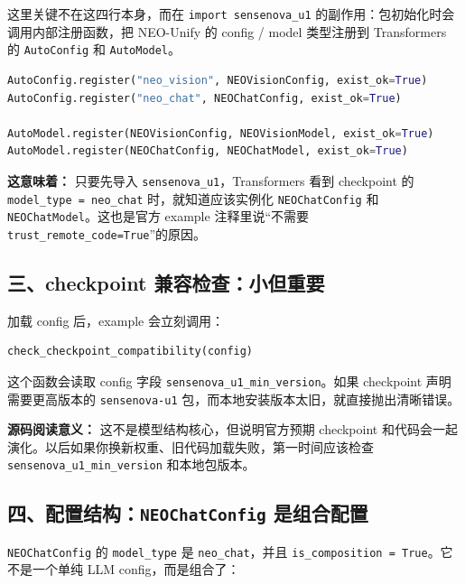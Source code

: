 这里关键不在这四行本身，而在 \texttt{import sensenova\_u1} 的副作用：包初始化时会调用内部注册函数，把 NEO-Unify 的 config / model 类型注册到 Transformers 的 \texttt{AutoConfig} 和 \texttt{AutoModel}。

\begin{lstlisting}[language=Python]
AutoConfig.register("neo_vision", NEOVisionConfig, exist_ok=True)
AutoConfig.register("neo_chat", NEOChatConfig, exist_ok=True)

AutoModel.register(NEOVisionConfig, NEOVisionModel, exist_ok=True)
AutoModel.register(NEOChatConfig, NEOChatModel, exist_ok=True)
\end{lstlisting}

\begin{summarybox}
\textbf{这意味着：} 只要先导入 \texttt{sensenova\_u1}，Transformers 看到 checkpoint 的 \texttt{model\_type = neo\_chat} 时，就知道应该实例化 \texttt{NEOChatConfig} 和 \texttt{NEOChatModel}。这也是官方 example 注释里说“不需要 \texttt{trust\_remote\_code=True}”的原因。
\end{summarybox}

\subsection{三、checkpoint 兼容检查：小但重要}

加载 config 后，example 会立刻调用：

\begin{lstlisting}[language=Python]
check_checkpoint_compatibility(config)
\end{lstlisting}

这个函数会读取 config 字段 \texttt{sensenova\_u1\_min\_version}。如果 checkpoint 声明需要更高版本的 \texttt{sensenova-u1} 包，而本地安装版本太旧，就直接抛出清晰错误。

\begin{intubox}
\textbf{源码阅读意义：} 这不是模型结构核心，但说明官方预期 checkpoint 和代码会一起演化。以后如果你换新权重、旧代码加载失败，第一时间应该检查 \texttt{sensenova\_u1\_min\_version} 和本地包版本。
\end{intubox}

\subsection{四、配置结构：\texttt{NEOChatConfig} 是组合配置}

\texttt{NEOChatConfig} 的 \texttt{model\_type} 是 \texttt{neo\_chat}，并且 \texttt{is\_composition = True}。它不是一个单纯 LLM config，而是组合了：

